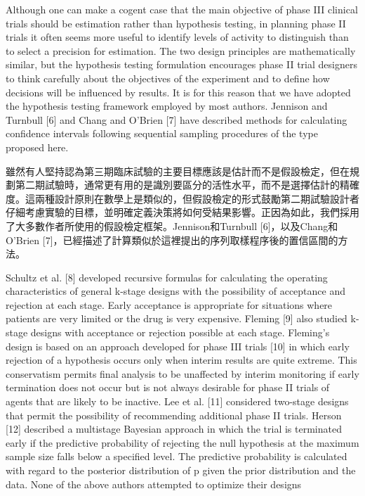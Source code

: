 	Although one can make a cogent case that the main objective of phase III clinical trials should be estimation rather than hypothesis testing, in planning phase II trials it often seems more useful to identify levels of activity to distinguish than to select a precision for estimation. The two design principles are mathematically similar, but the hypothesis testing formulation encourages phase II trial designers to think carefully about the objectives of the experiment and to define how decisions will be influenced by results. It is for this reason that we have adopted the hypothesis testing framework employed by most authors. Jennison and Turnbull [6] and Chang and O'Brien [7] have described methods for calculating confidence intervals following sequential sampling procedures of the type proposed here. 

	雖然有人堅持認為第三期臨床試驗的主要目標應該是估計而不是假設檢定，但在規劃第二期試驗時，通常更有用的是識別要區分的活性水平，而不是選擇估計的精確度。這兩種設計原則在數學上是類似的，但假設檢定的形式鼓勵第二期試驗設計者仔細考慮實驗的目標，並明確定義決策將如何受結果影響。正因為如此，我們採用了大多數作者所使用的假設檢定框架。Jennison和Turnbull [6]，以及Chang和O'Brien [7]，已經描述了計算類似於這裡提出的序列取樣程序後的置信區間的方法。

	Schultz et al. [8] developed recursive formulas for calculating the operating characteristics of general k-stage designs with the possibility of acceptance and rejection at each stage. Early acceptance is appropriate for situations where patients are very limited or the drug is very expensive. Fleming [9] also studied k-stage designs with acceptance or rejection possible at each stage. Fleming's design is based on an approach developed for phase III trials [10] in which early rejection of a hypothesis occurs only when interim results are quite extreme. This conservatism permits final analysis to be unaffected by interim monitoring if early termination does not occur but is not always desirable for phase II trials of agents that are likely to be inactive. Lee et al. [11] considered two-stage designs that permit the possibility of recommending additional phase II trials. Herson [12] described a multistage Bayesian approach in which the trial is terminated early if the predictive probability of rejecting the null hypothesis at the maximum sample size falls below a specified level. The predictive probability is calculated with regard to the posterior distribution of p given the prior distribution and the data. None of the above authors attempted to optimize their designs


